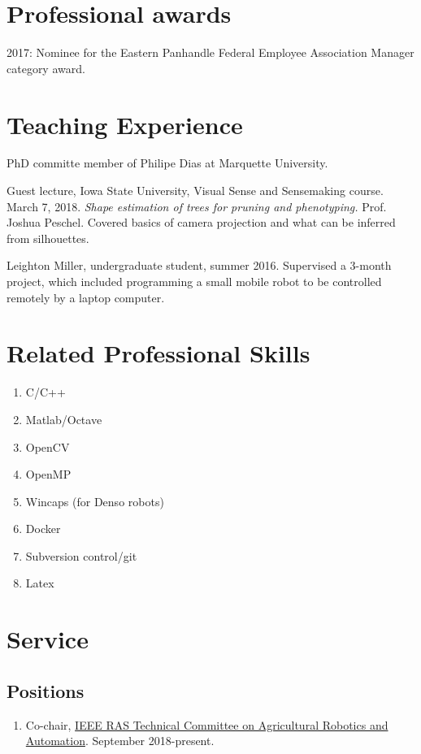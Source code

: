 \documentclass[letterpaper,11pt]{article}
\begin{document}
\section{Professional awards}
{2017: Nominee for the Eastern Panhandle Federal Employee Association Manager category award.}  

\section{Teaching Experience}
\begin{enumerate}[noitemsep,leftmargin=*,label={[TE\arabic*]}]
\item{PhD committe member of Philipe Dias at Marquette University.}

\item{ Guest lecture, Iowa State University, Visual Sense and Sensemaking course.  March 7, 2018. {\it Shape estimation of trees for pruning and phenotyping.} Prof. Joshua Peschel.  Covered basics of camera projection and what can be inferred from silhouettes.}

\item {Leighton Miller, undergraduate student, summer 2016.  Supervised a 3-month project, which included programming a small mobile robot to be controlled remotely by a laptop computer.}
\end{enumerate}

\section{Related Professional Skills}
\begin{enumerate}[noitemsep, leftmargin=*,label={}]
\item{C/C++}
\item{Matlab/Octave}
\item{OpenCV}
\item{OpenMP}
\item{Wincaps (for Denso robots)}
\item{Docker}
\item{Subversion control/git}
\item{Latex}
\end{enumerate}


\section{Service}

\subsection{Positions}
\begin{enumerate}[noitemsep, leftmargin=*,label={}]
\item{Co-chair, \href{http://ieeeagra.com/}{IEEE RAS Technical Committee on Agricultural Robotics and Automation}.  September 2018-present.}
\end{enumerate}
\end{document}
